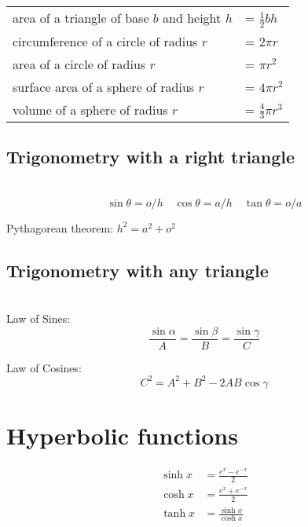 \noindent\begin{tabular}{p{100mm}l} %
  area of a triangle of base $b$ and height $h$     & = $\frac{1}{2}bh$ \\
  circumference of a circle of radius $r$           &= $2\pi r$ \\
  area of a circle of radius $r$                    &= $\pi r^2$ \\
  surface area of a sphere of radius $r$            &= $4\pi r^2$ \\
  volume of a sphere of radius $r$                  &= $\frac{4}{3}\pi r^3$
\end{tabular}

\subsection{Trigonometry with a right triangle}

\noindent{}\\
  \begin{equation*}
 \sin\theta  = o/h \quad
 \cos\theta = a/h \quad
 \tan\theta = o/a
 \end{equation*}

Pythagorean theorem: $h^2=a^2+o^2$

\subsection{Trigonometry with any triangle}

\\
Law of Sines:
  \begin{equation*} \frac{\sin\alpha}{A}=\frac{\sin\beta}{B}=\frac{\sin\gamma}{C} \end{equation*}

\noindent Law of Cosines:
  \begin{equation*} C^2 = A^2 + B^2 - 2AB \cos \gamma \end{equation*}

\section{Hyperbolic functions}

\begin{align*}
  \sinh x &= \frac{e^x-e^{-x}}{2} \\
  \cosh x &= \frac{e^x+e^{-x}}{2} \\
  \tanh x &= \frac{\sinh x}{\cosh x}
\end{align*}

